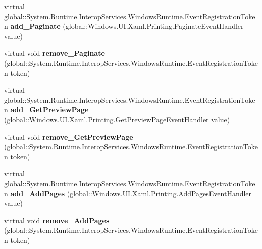 \begin{DoxyCompactItemize}
virtual global\+::\+System.\+Runtime.\+Interop\+Services.\+Windows\+Runtime.\+Event\+Registration\+Token {\bfseries add\+\_\+\+Paginate} (global\+::\+Windows.\+U\+I.\+Xaml.\+Printing.\+Paginate\+Event\+Handler value)
\item 
\mbox{\label{class_windows_1_1_u_i_1_1_xaml_1_1_printing_1_1_print_document_af8447e29ab1c6aeff221a7ecf57c48a5}} 
virtual void {\bfseries remove\+\_\+\+Paginate} (global\+::\+System.\+Runtime.\+Interop\+Services.\+Windows\+Runtime.\+Event\+Registration\+Token token)
\item 
\mbox{\label{class_windows_1_1_u_i_1_1_xaml_1_1_printing_1_1_print_document_a7f3e8c94058352a6d36e6c86a1f14425}} 
virtual global\+::\+System.\+Runtime.\+Interop\+Services.\+Windows\+Runtime.\+Event\+Registration\+Token {\bfseries add\+\_\+\+Get\+Preview\+Page} (global\+::\+Windows.\+U\+I.\+Xaml.\+Printing.\+Get\+Preview\+Page\+Event\+Handler value)
\item 
\mbox{\label{class_windows_1_1_u_i_1_1_xaml_1_1_printing_1_1_print_document_a049493be7cb40ba87e23a1fff9cca61a}} 
virtual void {\bfseries remove\+\_\+\+Get\+Preview\+Page} (global\+::\+System.\+Runtime.\+Interop\+Services.\+Windows\+Runtime.\+Event\+Registration\+Token token)
\item 
\mbox{\label{class_windows_1_1_u_i_1_1_xaml_1_1_printing_1_1_print_document_abcf27815570562c0335caae5ab74ff34}} 
virtual global\+::\+System.\+Runtime.\+Interop\+Services.\+Windows\+Runtime.\+Event\+Registration\+Token {\bfseries add\+\_\+\+Add\+Pages} (global\+::\+Windows.\+U\+I.\+Xaml.\+Printing.\+Add\+Pages\+Event\+Handler value)
\item 
\mbox{\label{class_windows_1_1_u_i_1_1_xaml_1_1_printing_1_1_print_document_ac0b62cd4a9c0d95589b9afcb1f7a0082}} 
virtual void {\bfseries remove\+\_\+\+Add\+Pages} (global\+::\+System.\+Runtime.\+Interop\+Services.\+Windows\+Runtime.\+Event\+Registration\+Token token)
\item 
\mbox{\label{class_windows_1_1_u_i_1_1_xaml_1_1_printing_1_1_print_document_ab73e0795893f75e4c311206a05f5604e}} 

\end{DoxyCompactItemize}

